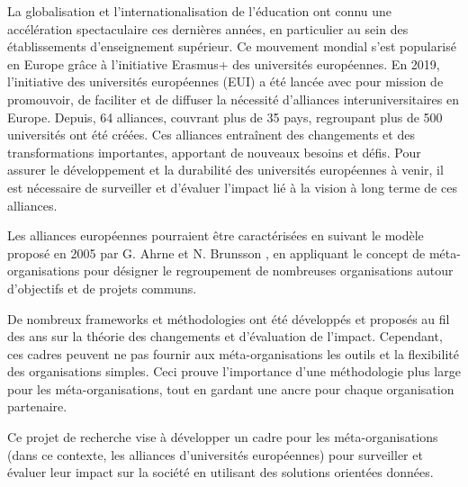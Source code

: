La globalisation et l'internationalisation de l'éducation ont connu une accélération spectaculaire ces dernières années, en particulier au sein des établissements d'enseignement supérieur. Ce mouvement mondial s'est popularisé en Europe grâce à l'initiative Erasmus+ des universités européennes. En 2019, l'initiative des universités européennes (EUI) a été lancée avec pour mission de promouvoir, de faciliter et de diffuser la nécessité d'alliances interuniversitaires en Europe. Depuis, 64 alliances, couvrant plus de 35 pays, regroupant plus de 500 universités ont été créées. Ces alliances entraînent des changements et des transformations importantes, apportant de nouveaux besoins et défis. Pour assurer le développement et la durabilité des universités européennes à venir, il est nécessaire de surveiller et d'évaluer l'impact lié à la vision à long terme de ces alliances.

Les alliances européennes pourraient être caractérisées en suivant le modèle proposé en 2005 par G. Ahrne et N. Brunsson \cite{ahrne_organizations_2005}, en appliquant le concept de méta-organisations pour désigner le regroupement de nombreuses organisations autour d'objectifs et de projets communs. 

De nombreux frameworks et méthodologies ont été développés et proposés au fil des ans sur la théorie des changements et  d'évaluation de l'impact. Cependant, ces cadres peuvent ne pas fournir aux méta-organisations les outils et la flexibilité des organisations simples. Ceci prouve l'importance d'une méthodologie plus large pour les méta-organisations, tout en gardant une ancre pour chaque organisation partenaire.

Ce projet de recherche vise à développer un cadre pour les méta-organisations (dans ce contexte, les alliances d'universités européennes) pour surveiller et évaluer leur impact sur la société en utilisant des solutions orientées données.